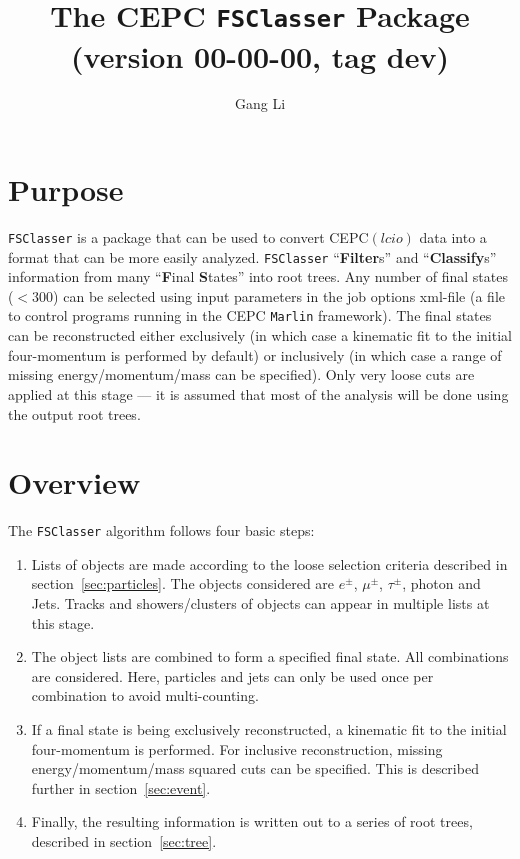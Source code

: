 \documentclass[11pt,a4paper]{define/cepcnote}
\title{The CEPC {\tt FSClasser} Package\\ (version 00-00-00, tag dev)}
\author{Gang Li}
\begin{document}
\tableofcontents
\clearpage

\section{Purpose}

{\tt FSClasser} is a package that can be used to convert CEPC$(lcio)$ data into a format that can be more easily analyzed.  
{\tt FSClasser} ``{\bf Filter}s'' and ``{\bf Classify}s'' information from many ``{\bf F}inal {\bf S}tates'' into root trees.  
Any number of final states ($<300$) can be selected using input parameters in the job options xml-file 
(a file to control programs running in the CEPC {\tt Marlin} framework).  
The final states can be reconstructed either exclusively 
(in which case a kinematic fit to the initial four-momentum is performed by default) 
or inclusively (in which case a range of missing energy/momentum/mass can be specified).  
Only very loose cuts are applied at this stage --- it is assumed that most of the analysis will be done using the output root trees.

\section{Overview}

The {\tt FSClasser} algorithm follows four basic steps:

\begin{enumerate}
\item{Lists of objects are made according to the loose selection criteria described in section~\ref{sec:particles}.  
	   The objects considered are $e^{\pm}$, $\mu^{\pm}$, $\tau^{\pm}$, photon and Jets. 
      Tracks and showers/clusters of objects can appear in multiple lists at this stage.}
\item{The object lists are combined to form a specified final state.  
	   All combinations are considered.  
		Here, particles and jets can only be used once per combination to avoid multi-counting.}
\item{If a final state is being exclusively reconstructed, 
	   a kinematic fit to the initial four-momentum is performed.  
		For inclusive reconstruction, missing energy/momentum/mass squared cuts can be specified.  
		This is described further in section~\ref{sec:event}.}
\item{Finally, the resulting information is written out to a series of root trees, described in section~\ref{sec:tree}.}
\end{enumerate}
\end{document}
